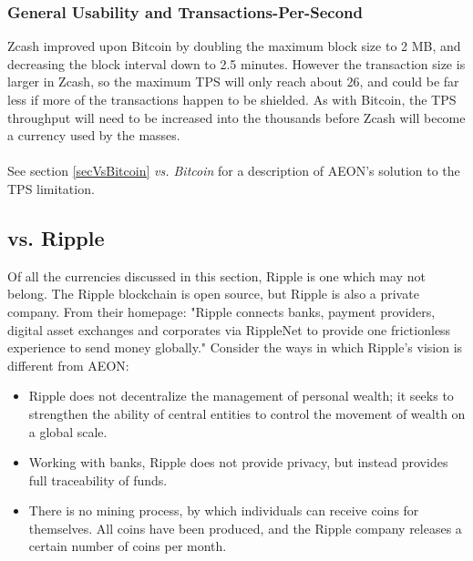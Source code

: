 \subsubsection{General Usability and Transactions-Per-Second}
Zcash improved upon Bitcoin by doubling the maximum block size to 2 MB, and decreasing the block interval down to 2.5 minutes.  However the transaction size is larger in Zcash, so the maximum TPS will only reach about 26, and could be far less if more of the transactions happen to be shielded.  As with Bitcoin, the TPS throughput will need to be increased into the thousands before Zcash will become a currency used by the masses.\\
\\
See section \ref{secVsBitcoin} \textit{vs. Bitcoin} for a description of AEON’s solution to the TPS limitation.

\subsection{vs. Ripple}
Of all the currencies discussed in this section, Ripple is one which may not belong.  The Ripple blockchain is open source, but Ripple is also a private company.  From their homepage:  "Ripple connects banks, payment providers, digital asset exchanges and corporates via RippleNet to provide one frictionless experience to send money globally."  Consider the ways in which Ripple's vision is different from AEON:

\begin{itemize}
	\item Ripple does not decentralize the management of personal wealth; it seeks to strengthen the ability of central entities to control the movement of wealth on a global scale.
	\item Working with banks, Ripple does not provide privacy, but instead provides full traceability of funds.
	\item There is no mining process, by which individuals can receive coins for themselves.  All coins have been produced, and the Ripple company releases a certain number of coins per month.
\end{itemize}

